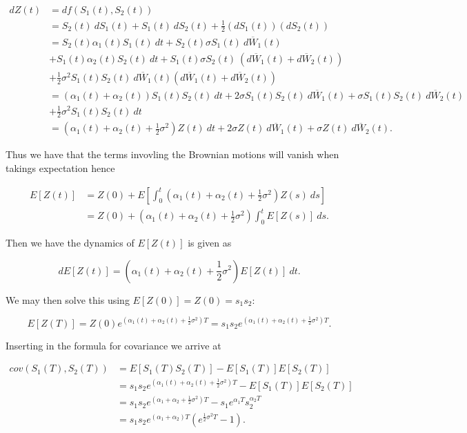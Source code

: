 \documentclass[
]{article}
\begin{document}
\begin{align*}
dZ(t)&=df(S_1(t),S_2(t))\\
&=S_2(t)\ dS_1(t)+S_1(t)\ dS_2(t)+\frac{1}{2}(dS_1(t))(dS_2(t))\\
&=S_2(t)\alpha_1(t) S_1(t)\ dt+S_2(t)\sigma S_1(t)\ d\overline{W}_1(t)\\
&+S_1(t)\alpha_2(t) S_2(t)\ dt+S_1(t)\sigma S_2(t)\ (d\overline{W}_1(t)+d\overline{W}_2(t))\\
&+\frac{1}{2}\sigma^2S_1(t)S_2(t)\ d\overline{W}_1(t)(d\overline{W}_1(t)+d\overline{W}_2(t))\\
&=(\alpha_1(t)+\alpha_2(t))S_1(t) S_2(t)\ dt+2\sigma S_1(t) S_2(t)\ d\overline{W}_1(t) + \sigma S_1(t) S_2(t)\ d\overline{W}_2(t)\\
&+\frac{1}{2}\sigma^2S_1(t)S_2(t)\ dt\\
&=(\alpha_1(t)+\alpha_2(t)+\frac{1}{2}\sigma^2)Z(t)\ dt+2\sigma Z(t)\ d\overline{W}_1(t) + \sigma Z(t)\ d\overline{W}_2(t).
\end{align*}

Thus we have that the terms invovling the Brownian motions will vanish
when takings expectation hence

\begin{align*}
E[Z(t)]&=Z(0)+E\left[\int_0^t(\alpha_1(t)+\alpha_2(t)+\frac{1}{2}\sigma^2)Z(s)\ ds\right]\\
&=Z(0)+(\alpha_1(t)+\alpha_2(t)+\frac{1}{2}\sigma^2)\int_0^tE\left[Z(s)\right]\ ds.
\end{align*}

Then we have the dynamics of \(E[Z(t)]\) is given as

\[
dE[Z(t)]=(\alpha_1(t)+\alpha_2(t)+\frac{1}{2}\sigma^2)E\left[Z(t)\right]\ dt.
\]

We may then solve this using \(E[Z(0)]=Z(0)=s_1s_2\):

\[
E[Z(T)]=Z(0)e^{(\alpha_1(t)+\alpha_2(t)+\frac{1}{2}\sigma^2)T}=s_1s_2e^{(\alpha_1(t)+\alpha_2(t)+\frac{1}{2}\sigma^2)T}.
\]

Inserting in the formula for covariance we arrive at

\begin{align*}
cov(S_1(T),S_2(T))&=E\left[S_1(T)S_2(T)\right]-E[S_1(T)]E[S_2(T)]\\
&=s_1s_2e^{(\alpha_1(t)+\alpha_2(t)+\frac{1}{2}\sigma^2)T}-E[S_1(T)]E[S_2(T)]\\
&=s_1s_2e^{(\alpha_1+\alpha_2+\frac{1}{2}\sigma^2)T}-s_1e^{\alpha_1T}s_2^{\alpha_2T}\\
&=s_1s_2e^{(\alpha_1+\alpha_2)T}\left(e^{\frac{1}{2}\sigma^2T}-1\right).
\end{align*}
\end{document}
